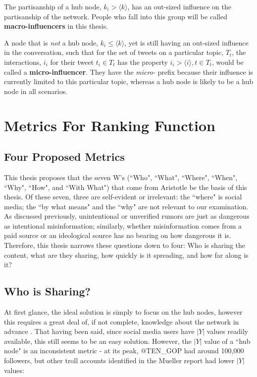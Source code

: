 \documentclass[preprint,review,12pt]{elsarticle}
\begin{document}
 The partisanship of a hub node, $k_i > \langle k \rangle$, has an out-sized influence on the partisanship of the network. People who fall into this group will be called \textbf{macro-influencers} in this thesis.
 
 A node that is \textit{not} a hub node, $k_i \leq \langle k \rangle$, yet is still having an out-sized influence in the conversation, such that for the set of tweets on a particular topic, $T_t$, the interactions, $i_i$ for their tweet $t_i \in T_t$ has the property $i_i > \langle i \rangle, t \in T_t$, would be called a \textbf{micro-influencer}. They have the \textit{micro-} prefix because their influence is currently limited to this particular topic, whereas a hub node is likely to be a hub node in all scenarios.

\section{Metrics For Ranking Function}
\subsection{Four Proposed Metrics}
This thesis proposes that the seven W's (``Who", ``What", ``Where", ``When", ``Why", ``How", and ``With What") that come from Aristotle \cite{sloan2010aristotle,aquinas1952thomas} be the basis of this thesis. Of these seven, three are self-evident or irrelevant: the ``where" is social media; the ``by what means" and the ``why" are not relevant to our examination. As discussed previously, unintentional or unverified rumors are just as dangerous as intentional misinformation; similarly, whether misinformation comes from a paid source or an ideological source has no bearing on how dangerous it is. Therefore, this thesis narrows these questions down to four: Who is sharing the content, what are they sharing, how quickly is it spreading, and how far along is it?

\subsection{Who is Sharing?}
At first glance, the ideal solution is simply to focus on the hub nodes, however this requires a great deal of, if not complete, knowledge about the network in advance  \cite{dezsHo2002halting,pastor2002immunization}. That having been said, since social media users have $|Y|$ values readily available, this still seems to be an easy solution. However, the $|Y|$ value of a ``hub node" is an inconsistent metric - at its peak, @TEN\_GOP had around 100,000 followers, but other troll accounts identified in the Mueller report had lower $|Y|$ values:
\end{document}
